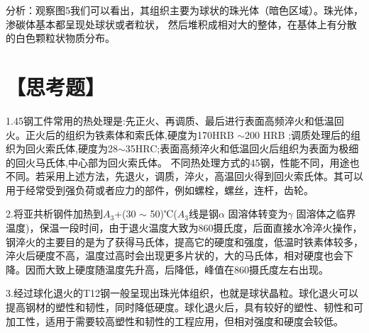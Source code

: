 \documentclass[a4paper,utf8]{article}
\begin{document}
\begin{figure}[!ht]
    \begin{floatrow}
    \end{floatrow}

\end{figure}

分析：观察图5我们可以看出，其组织主要为球状的珠光体（暗色区域）。珠光体，渗碳体基本都呈现处球状或者粒状，
然后堆积成相对大的整体，在基体上有分散的白色颗粒状物质分布。

\section*{【思考题】}

1.45钢工件常用的热处理是:先正火、再调质、最后进行表面高频淬火和低温回火。正火后的组织为铁素体和索氏体,硬度为170HRB $\sim $200 HRB ;调质处理后的组织为回火索氏体,硬度为28$\sim $35HRC;表面高频淬火和低温回火后组织为表面为极细的回火马氏体,中心部为回火索氏体。
不同热处理方式的45钢，性能不同，用途也不同。若采用上述方法，先退火，调质，淬火，高温回火得到回火索氏体。其可以用于经常受到强负荷或者应力的部件，例如螺栓，螺丝，连杆，齿轮。

2.将亚共析钢件加热到$A_3$+(30 $\sim$ 50)℃($A_3$线是钢$\alpha$ 固溶体转变为$\gamma$ 固溶体之临界温度)，保温一段时间，由于退火温度大致为860摄氏度，后面直接水冷淬火操作，钢淬火的主要目的是为了获得马氏体，提高它的硬度和强度，低温时铁素体较多，淬火后硬度不高，温度过高时会出现更多片状的，大的马氏体，相对硬度也会下降。因而大致上硬度随温度先升高，后降低，峰值在860摄氏度左右出现。

3.经过球化退火的T12钢一般呈现出珠光体组织，也就是球状晶粒。球化退火可以提高钢材的塑性和韧性，同时降低硬度。球化退火后，具有较好的塑性、韧性和可加工性，适用于需要较高塑性和韧性的工程应用，但相对强度和硬度会较低。
\end{document}
